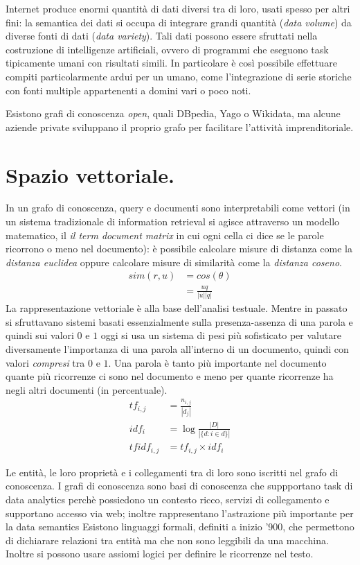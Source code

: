 \documentclass[11pt]{article}
\begin{document}
Internet produce enormi quantità di dati diversi tra di loro, usati spesso per altri fini: la semantica dei dati si occupa di integrare grandi quantità (\textit{data volume}) da diverse fonti di dati (\textit{data variety}).
Tali dati possono essere sfruttati nella costruzione di intelligenze artificiali, ovvero di programmi che eseguono task tipicamente umani con risultati simili.
In particolare è così possibile effettuare compiti particolarmente ardui per un umano, come l'integrazione di serie storiche con fonti multiple appartenenti a domini vari o poco noti.

Esistono grafi di conoscenza \textit{open}, quali DBpedia, Yago o Wikidata, ma alcune aziende private sviluppano il proprio grafo per facilitare l'attività imprenditoriale.


\section{Spazio vettoriale.}
In un grafo di conoscenza, query e documenti sono interpretabili come vettori (in un sistema tradizionale di information retrieval si agisce attraverso un modello matematico, il \textit{il term document matrix} in cui ogni cella ci dice se le parole ricorrono o meno nel documento): è possibile calcolare misure di distanza come la \textit{distanza euclidea} oppure calcolare misure di similarità come la \textit{distanza coseno}.
\begin{align*}
  sim(r, u) &= cos(\theta) \\
            &= \frac{u q}{|u| |q|}
  \end{align*}
La rappresentazione vettoriale è alla base dell'analisi testuale.
Mentre in passato si sfruttavano sistemi basati essenzialmente sulla presenza-assenza di una parola e quindi sui valori $0$ e $1$ oggi si usa un sistema di pesi più sofisticato per valutare diversamente l'importanza di una parola all'interno di un documento, quindi con valori \textit{compresi} tra $0$ e $1$.
Una parola è tanto più importante nel documento quante più ricorrenze ci sono nel documento e meno per quante ricorrenze ha negli altri documenti (in percentuale).
\begin{align*}
  tf_{i, j} &= \frac{n_{i,j}}{|d_j|} \\
  idf_i &= \log{\frac{|D|}{|\{d : i \in d\}|}} \\
  tfidf_{i, j} &= tf_{i, j} \times idf_i
\end{align*}

Le entità, le loro proprietà e i collegamenti tra di loro sono iscritti nel grafo di conoscenza. I grafi di conoscenza sono basi di conoscenza che suppportano task di data analytics perchè possiedono un contesto ricco, servizi di collegamento e supportano accesso via web; inoltre rappresentano l'astrazione più importante per la data semantics 
Esistono linguaggi formali, definiti a inizio '900, che permettono di dichiarare relazioni tra entità ma che non sono leggibili da una macchina.
Inoltre si possono usare assiomi logici per definire le ricorrenze nel testo.
\end{document}
